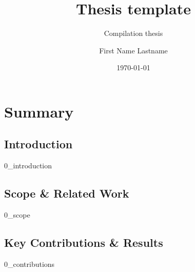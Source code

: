 \documentclass[electronic,oldfontcommands]{kthesis}
\begin{document}
\title{Thesis template}
\subtitle{Compilation thesis}
\author{{First Name} {Lastname}}
\date{\today}
\address{%
	KTH Royal Institute of Technology\\%
	School of Electrical Engineering and Computer Science\\%
	Division of Information Science and Engineering\\%
	SE-10044 Stockholm\\%
	Sweden%
}
\maketitle

\frontmatter%




\ifdraft
\else
	\printglossary[type=\acronymtype, style=long, title=List of Acronyms]
	\clearpage%
	\tableofcontents%
\fi

\mainmatter%
\glsresetall{} %
\part{Summary}\label{part:summary}
\newrefsection%
\chapter{Introduction}\label{chap:introduction}
{0_introduction}

\chapter{Scope \& Related Work}\label{chap:scope}
{0_scope}

\chapter{Key Contributions \& Results}\label{chap:contributions}
{0_contributions}
\end{document}
